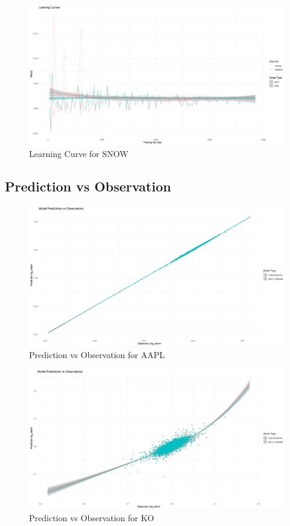 \documentclass{article}
\begin{document}
\begin{figure}[h]
    \centering
    \includegraphics[width=0.9\linewidth]{visuals/Learning_curves_snow.png}
    \caption{Learning Curve for SNOW}
\end{figure}

\subsection{Prediction vs Observation}

\begin{figure}[h]
    \centering
    \includegraphics[width=0.9\linewidth]{visuals/pred_obs_aapl.png}
    \caption{Prediction vs Observation for AAPL}
\end{figure}

\begin{figure}[h]
    \centering
    \includegraphics[width=0.9\linewidth]{visuals/pred_obs_ko.png}
    \caption{Prediction vs Observation for KO}
\end{figure}
\end{document}

